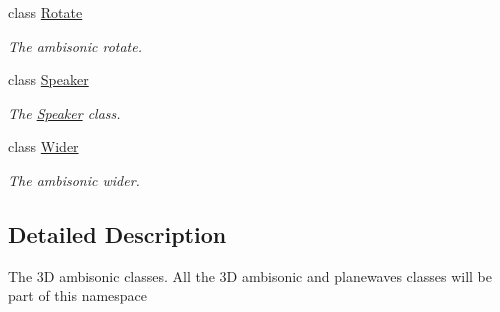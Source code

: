 \begin{DoxyCompactItemize}
class \hyperlink{class_hoa3_d_1_1_rotate}{Rotate}
\begin{DoxyCompactList}\small\item\em The ambisonic rotate. \end{DoxyCompactList}\item 
class \hyperlink{class_hoa3_d_1_1_speaker}{Speaker}
\begin{DoxyCompactList}\small\item\em The \hyperlink{class_hoa3_d_1_1_speaker}{Speaker} class. \end{DoxyCompactList}\item 
class \hyperlink{class_hoa3_d_1_1_wider}{Wider}
\begin{DoxyCompactList}\small\item\em The ambisonic wider. \end{DoxyCompactList}\end{DoxyCompactItemize}


\subsection{Detailed Description}
The 3\-D ambisonic classes. All the 3\-D ambisonic and planewaves classes will be part of this namespace 
